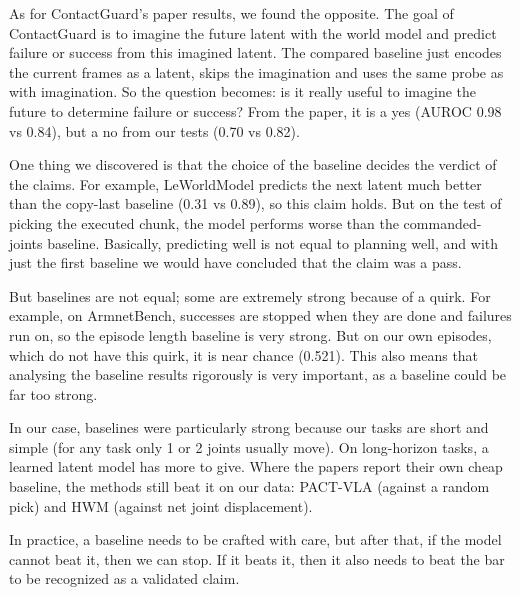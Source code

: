 \documentclass[10pt,twocolumn]{article}
\begin{document}
As for ContactGuard's paper results, we found the opposite. The goal of ContactGuard is to imagine the future latent with the world model and predict failure or success from this imagined latent. The compared baseline just encodes the current frames as a latent, skips the imagination and uses the same probe as with imagination. So the question becomes: is it really useful to imagine the future to determine failure or success? From the paper, it is a yes (AUROC 0.98 vs 0.84), but a no from our tests (0.70 vs 0.82).


One thing we discovered is that the choice of the baseline decides the verdict of the claims. For example, LeWorldModel predicts the next latent much better than the copy-last baseline (0.31 vs 0.89), so this claim holds. But on the test of picking the executed chunk, the model performs worse than the commanded-joints baseline. Basically, predicting well is not equal to planning well, and with just the first baseline we would have concluded that the claim was a pass.


But baselines are not equal; some are extremely strong because of a quirk. For example, on ArmnetBench, successes are stopped when they are done and failures run on, so the episode length baseline is very strong. But on our own episodes, which do not have this quirk, it is near chance (0.521). This also means that analysing the baseline results rigorously is very important, as a baseline could be far too strong.


In our case, baselines were particularly strong because our tasks are short and simple (for any task only 1 or 2 joints usually move). On long-horizon tasks, a learned latent model has more to give. Where the papers report their own cheap baseline, the methods still beat it on our data: PACT-VLA (against a random pick) and HWM (against net joint displacement).


In practice, a baseline needs to be crafted with care, but after that, if the model cannot beat it, then we can stop. If it beats it, then it also needs to beat the bar to be recognized as a validated claim.
\end{document}
